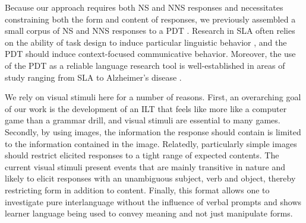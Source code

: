 \documentclass[11pt,letterpaper]{article}
\newcommand{\md}[1]{\marginpar{\scriptsize MD: #1}}
\newcommand{\lk}[1]{\marginpar{\scriptsize LK: #1}}
\renewcommand{\marginpar}[1]{}
\begin{document}
Because our approach requires both NS and NNS responses and
necessitates constraining both the form and content of responses, we
previously assembled a small corpus of NS and NNS responses to a PDT
\citep{king:dickinson:13}.  Research in SLA often relies on the
ability of task design to induce particular linguistic behavior
\citep{skehan1998assessing}, and the PDT should induce context-focused
communicative behavior.  Moreover, the use of the PDT as a reliable
language research tool is well-established in areas of study ranging
from SLA to Alzheimer's disease \citep{ellis2000task,
  forbes2005detecting}.

We rely on visual stimuli here for a number of reasons. First, an overarching goal of our work is the development of an ILT that feels like more like a computer game than a grammar drill, and visual stimuli are essential to many games.
Secondly, by using images, the information the response should contain is limited
to the information contained in the image. Relatedly, particularly
simple images should restrict elicited responses to a tight range of
expected contents. 
The current visual stimuli present events that are mainly
transitive in nature and likely to elicit responses with an
unambiguous subject, verb and object, thereby restricting form in
addition to content. Finally, this format allows one to investigate
pure interlanguage without the influence of verbal prompts and shows
learner language being used to convey meaning and not just manipulate forms.
\end{document}
